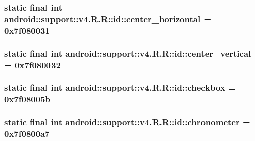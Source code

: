 \hypertarget{classandroid_1_1support_1_1v4_1_1_r_1_1id_ed66d72024f128b88784e81236fb3a2f}{
\subsubsection[{center\_\-horizontal}]{\setlength{\rightskip}{0pt plus 5cm}static final int android::support::v4.R.R::id::center\_\-horizontal = 0x7f080031}}
\label{classandroid_1_1support_1_1v4_1_1_r_1_1id_ed66d72024f128b88784e81236fb3a2f}


\hypertarget{classandroid_1_1support_1_1v4_1_1_r_1_1id_d2fe9e9082f77755180666784d639fe5}{
\subsubsection[{center\_\-vertical}]{\setlength{\rightskip}{0pt plus 5cm}static final int android::support::v4.R.R::id::center\_\-vertical = 0x7f080032}}
\label{classandroid_1_1support_1_1v4_1_1_r_1_1id_d2fe9e9082f77755180666784d639fe5}


\hypertarget{classandroid_1_1support_1_1v4_1_1_r_1_1id_e68c379fd3871b9ba51e3d37d276fe90}{
\subsubsection[{checkbox}]{\setlength{\rightskip}{0pt plus 5cm}static final int android::support::v4.R.R::id::checkbox = 0x7f08005b}}
\label{classandroid_1_1support_1_1v4_1_1_r_1_1id_e68c379fd3871b9ba51e3d37d276fe90}


\hypertarget{classandroid_1_1support_1_1v4_1_1_r_1_1id_3cd0c97ea0658750b6544196f6fb681b}{
\subsubsection[{chronometer}]{\setlength{\rightskip}{0pt plus 5cm}static final int android::support::v4.R.R::id::chronometer = 0x7f0800a7}}
\label{classandroid_1_1support_1_1v4_1_1_r_1_1id_3cd0c97ea0658750b6544196f6fb681b}


